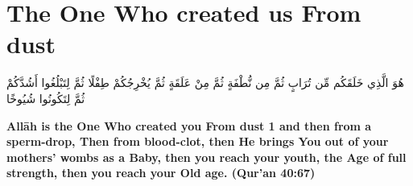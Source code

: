 \chapter{The One Who created us From dust}
\begin{center}
    {\Huge    
        \begin{Arabic}
            هُوَ الَّذِي خَلَقَكُم مِّن تُرَابٍ ثُمَّ مِن نُّطْفَةٍ ثُمَّ مِنْ عَلَقَةٍ ثُمَّ يُخْرِجُكُمْ طِفْلًا ثُمَّ لِتَبْلُغُوا أَشُدَّكُمْ ثُمَّ لِتَكُونُوا شُيُوخًا
        \end{Arabic}
    }
\end{center}
\vspace*{\fill}
\vspace{3cm}
\begin{center}
    \large \textbf{Allāh is the One Who created you From dust 1 and then from a sperm-drop, Then from blood-clot, then He brings You out of your mothers' wombs as a Baby, then you reach your youth, the Age of full strength, then you reach your Old age. (Qur'an 40:67)}
\end{center}
